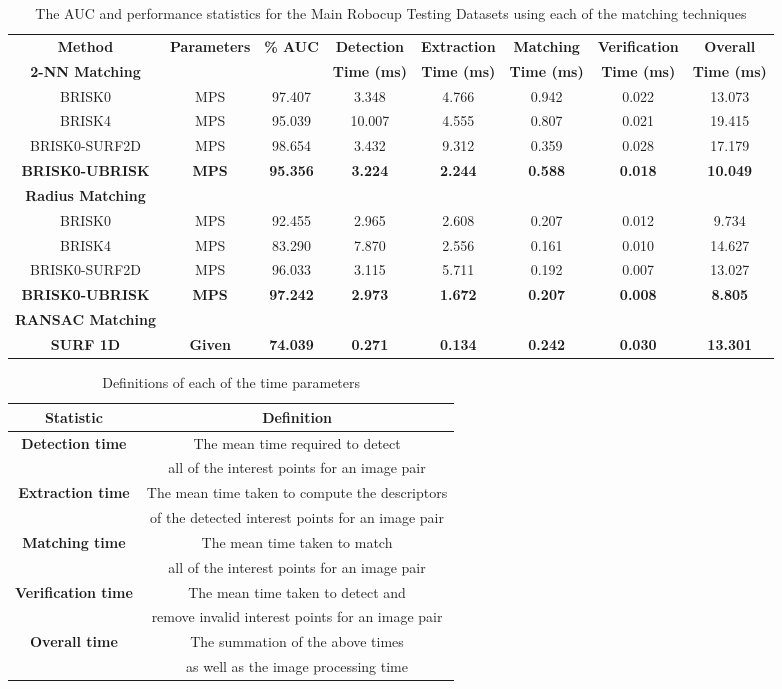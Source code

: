 \begin{table}
\centering
\caption{The AUC and performance statistics for the Main Robocup Testing Datasets using
each of the matching techniques}
\footnotesize
\begin{tabular}{|c|c|c|c|c|c|c|c|}
\hline 
\textbf{Method } & \textbf{Parameters} & \textbf{\% AUC} & \textbf{Detection} & \textbf{Extraction} & \textbf{Matching} & \textbf{Verification} & \textbf{Overall}\tabularnewline
\textbf{2-NN Matching} &  &  & \textbf{Time (ms)} & \textbf{Time (ms)} & \textbf{Time (ms)} & \textbf{Time (ms)} & \textbf{Time (ms)}\tabularnewline
\hline 
\hline 
BRISK0 & MPS & 97.407 & 3.348 & 4.766 & 0.942 & 0.022 & 13.073\tabularnewline
\hline 
BRISK4 & MPS & 95.039 & 10.007 & 4.555 & 0.807 & 0.021 & 19.415\tabularnewline
\hline 
BRISK0-SURF2D & MPS & 98.654 & 3.432 & 9.312 & 0.359 & 0.028 & 17.179\tabularnewline
\hline 
\textbf{BRISK0-UBRISK} & \textbf{MPS} & \textbf{95.356} & \textbf{3.224} & \textbf{2.244} & \textbf{0.588} & \textbf{0.018} & \textbf{10.049}\tabularnewline
\hline 
\hline 
\textbf{Radius Matching} &  &  &  &  &  &  & \tabularnewline
\hline 
BRISK0 & MPS & 92.455 & 2.965 & 2.608 & 0.207 & 0.012 & 9.734\tabularnewline
\hline 
BRISK4 & MPS & 83.290 & 7.870 & 2.556 & 0.161 & 0.010 & 14.627\tabularnewline
\hline 
BRISK0-SURF2D & MPS & 96.033 & 3.115 & 5.711 & 0.192 & 0.007 & 13.027\tabularnewline
\hline 
\textbf{BRISK0-UBRISK} & \textbf{MPS} & \textbf{97.242} & \textbf{2.973} & \textbf{1.672} & \textbf{0.207} & \textbf{0.008} & \textbf{8.805}\tabularnewline
\hline 
\hline 
\textbf{RANSAC Matching} &  &  &  &  &  &  & \tabularnewline
\hline 
\textbf{SURF 1D} & \textbf{Given} & \textbf{74.039} & \textbf{0.271} & \textbf{0.134} & \textbf{0.242} & \textbf{0.030} & \textbf{13.301}\tabularnewline
\hline 
\end{tabular}
\label{tab:mrd_times}
\end{table}

\begin{table}
\centering
\caption{Definitions of each of the time parameters}
\begin{tabular}{|c|c|}
\hline 
\textbf{Statistic} & \textbf{Definition}\tabularnewline
\hline 
\hline 
\textbf{Detection time} & The mean time required to detect \tabularnewline
 & all of the interest points for an image pair\tabularnewline
\hline 
\textbf{Extraction time} & The mean time taken to compute the descriptors \tabularnewline
 & of the detected interest points for an image pair\tabularnewline
\hline 
\textbf{Matching time} & The mean time taken to match \tabularnewline
 & all of the interest points for an image pair\tabularnewline
\hline 
\textbf{Verification time} & The mean time taken to detect and \tabularnewline
 & remove invalid interest points for an image pair\tabularnewline
\hline 
\textbf{Overall time} & The summation of the above times\tabularnewline
 &  as well as the image processing time\tabularnewline
\hline 
\end{tabular}
\label{tab:definitions}
\end{table}


